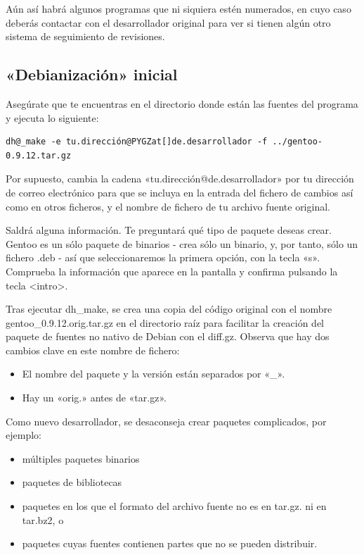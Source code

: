 \documentclass[letterpaper,12pt,spanish]{manual}
\begin{document}
Aún así habrá algunos programas que ni siquiera estén numerados, en cuyo caso deberás contactar con el desarrollador original para ver si tienen algún otro sistema de seguimiento de revisiones.


\subsection{«Debianización» inicial}

Asegúrate que te encuentras en el directorio donde están las fuentes del programa y ejecuta lo siguiente:

\begin{Verbatim}[commandchars=@\[\]]
dh@_make -e tu.dirección@PYGZat[]de.desarrollador -f ../gentoo-0.9.12.tar.gz
\end{Verbatim}

Por supuesto, cambia la cadena «tu.dirección@de.desarrollador» por tu dirección de correo electrónico para que se incluya en la entrada del fichero de cambios así como en otros ficheros, y el nombre de fichero de tu archivo fuente original.

Saldrá alguna información. Te preguntará qué tipo de paquete deseas crear. Gentoo es un sólo paquete de binarios - crea sólo un binario, y, por tanto, sólo un fichero .deb - así que seleccionaremos la primera opción, con la tecla «s». Comprueba la información que aparece en la pantalla y confirma pulsando la tecla \textless{}intro\textgreater{}.

Tras ejecutar dh\_make, se crea una copia del código original con el nombre gentoo\_0.9.12.orig.tar.gz en el directorio raíz para facilitar la creación del paquete de fuentes no nativo de Debian con el diff.gz. Observa que hay dos cambios clave en este nombre de fichero:
\begin{itemize}
\item {} 
El nombre del paquete y la versión están separados por «\_».

\item {} 
Hay un «orig.» antes de «tar.gz».

\end{itemize}

Como nuevo desarrollador, se desaconseja crear paquetes complicados, por ejemplo:
\begin{itemize}
\item {} 
múltiples paquetes binarios

\item {} 
paquetes de bibliotecas

\item {} 
paquetes en los que el formato del archivo fuente no es en tar.gz. ni en tar.bz2, o

\item {} 
paquetes cuyas fuentes contienen partes que no se pueden distribuir.

\end{itemize}
\end{document}
